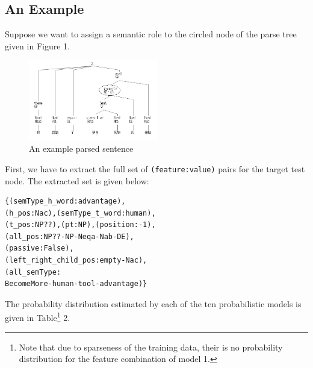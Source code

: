 \documentclass[11pt]{article}
\begin{document}
\subsection{An Example}
Suppose we want to assign a semantic role to the circled node of the parse tree given in Figure 1.
\begin{figure}[!h]
\centering
\includegraphics[width=.5\textwidth,height=3.5cm]{./examples/example3-circled.png}
\caption{An example parsed sentence}
\end{figure}
\noindent First, we have to extract the full set of \verb+(feature:value)+ pairs for the target test node. The extracted set is given below:
\begin{verbatim}
{(semType_h_word:advantage),
(h_pos:Nac),(semType_t_word:human),
(t_pos:NP??),(pt:NP),(position:-1),
(all_pos:NP??-NP-Neqa-Nab-DE),
(passive:False),
(left_right_child_pos:empty-Nac),
(all_semType:
BecomeMore-human-tool-advantage)}
\end{verbatim}
The probability distribution estimated by each of the ten probabilistic models is given in Table\footnote{Note that due to sparseness of the training data, their is no probability distribution for the feature combination of model 1.} 2.
\end{document}
